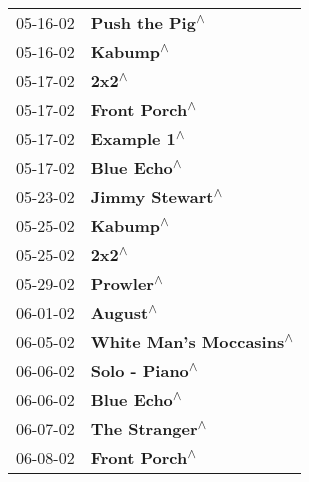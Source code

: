 \begin{supertabular}{p{0.25\columnwidth}p{0.75\columnwidth}}
 05-16-02 &                                                             \textbf{Push the Pig\textsuperscript{$\wedge$}} \\
 05-16-02 &                                                                   \textbf{Kabump\textsuperscript{$\wedge$}} \\
 05-17-02 &                                                                      \textbf{2x2\textsuperscript{$\wedge$}} \\
 05-17-02 &                                                              \textbf{Front Porch\textsuperscript{$\wedge$}} \\
 05-17-02 &                                                                \textbf{Example 1\textsuperscript{$\wedge$}} \\
 05-17-02 &                                                                \textbf{Blue Echo\textsuperscript{$\wedge$}} \\
 05-23-02 &                                                            \textbf{Jimmy Stewart\textsuperscript{$\wedge$}} \\
 05-25-02 &                                                                   \textbf{Kabump\textsuperscript{$\wedge$}} \\
 05-25-02 &                                                                      \textbf{2x2\textsuperscript{$\wedge$}} \\
 05-29-02 &                                                                  \textbf{Prowler\textsuperscript{$\wedge$}} \\
 06-01-02 &                                                                   \textbf{August\textsuperscript{$\wedge$}} \\
 06-05-02 &                                                    \textbf{White Man's Moccasins\textsuperscript{$\wedge$}} \\
 06-06-02 &                                                             \textbf{Solo - Piano\textsuperscript{$\wedge$}} \\
 06-06-02 &                                                                \textbf{Blue Echo\textsuperscript{$\wedge$}} \\
 06-07-02 &                                                             \textbf{The Stranger\textsuperscript{$\wedge$}} \\
 06-08-02 &                                                              \textbf{Front Porch\textsuperscript{$\wedge$}} \\

\end{supertabular}
